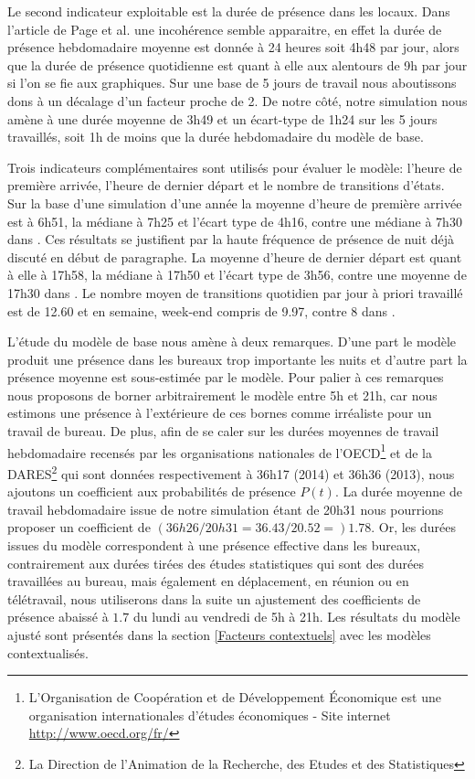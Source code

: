 Le second indicateur exploitable est la durée de présence dans les locaux. Dans l'article de Page et al. \cite{Page-08} une incohérence semble apparaitre, en effet la durée de présence hebdomadaire moyenne est donnée à 24 heures soit 4h48 par jour, alors que la durée de présence quotidienne est quant à elle aux alentours de 9h par jour si l'on se fie aux graphiques. Sur une base de 5 jours de travail nous aboutissons dons à un décalage d'un facteur proche de 2. De notre côté, notre simulation nous amène à une durée moyenne de 3h49 et un écart-type de 1h24 sur les 5 jours travaillés, soit 1h de moins que la durée hebdomadaire du modèle de base.

Trois indicateurs complémentaires sont utilisés pour évaluer le modèle: l'heure de première arrivée, l'heure de dernier départ et le nombre de transitions d'états. Sur la base d'une simulation d'une année la moyenne d'heure de première arrivée est à 6h51, la médiane à 7h25 et l'écart type de 4h16, contre une médiane à 7h30 dans \cite{Page-08}. Ces résultats se justifient par la haute fréquence de présence de nuit déjà discuté en début de paragraphe. La moyenne d'heure de dernier départ est quant à elle à 17h58, la médiane à 17h50 et l'écart type de 3h56, contre une moyenne de 17h30 dans \cite{Page-08}. Le nombre moyen de transitions quotidien par jour à priori travaillé est de 12.60 et en semaine, week-end compris de 9.97, contre 8 dans \cite{Page-08}.

L'étude du modèle de base nous amène à deux remarques. D'une part le modèle produit une présence dans les bureaux trop importante les nuits et d'autre part la présence moyenne est sous-estimée par le modèle. Pour palier à ces remarques nous proposons de borner arbitrairement le modèle entre 5h et 21h, car nous estimons une présence à l'extérieure de ces bornes comme irréaliste pour un travail de bureau. De plus, afin de se caler sur les durées moyennes de travail hebdomadaire recensés par les organisations nationales de l'OECD\footnote{L'Organisation de Coopération et de Développement Économique est une organisation internationales d'études économiques - Site internet \url{http://www.oecd.org/fr/}} \cite{OECD-14} et de la DARES\footnote{La Direction de l'Animation de la Recherche, des Etudes et des Statistiques} \cite{Pak-13} qui sont données respectivement à 36h17 (2014) et 36h36 (2013), nous ajoutons un coefficient aux probabilités de présence $P(t)$. La durée moyenne de travail hebdomadaire issue de notre simulation étant de 20h31 nous pourrions proposer un coefficient de $(36h26/20h31=36.43/20.52=)1.78 $. Or, les durées issues du modèle correspondent à une présence effective dans les bureaux, contrairement aux durées tirées des études statistiques  qui sont des durées travaillées au bureau, mais également en déplacement, en réunion ou en télétravail, nous utiliserons dans la suite un ajustement des coefficients de présence abaissé à $1.7$ du lundi au vendredi de 5h à 21h. Les résultats du modèle ajusté sont présentés dans la section \ref{Facteurs contextuels} avec les modèles contextualisés.

